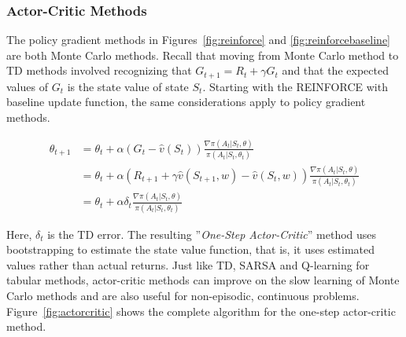 \subsubsection*{Actor-Critic Methods}

The policy gradient methods in Figures~\ref{fig:reinforce} and \ref{fig:reinforcebaseline} are both Monte Carlo methods. Recall that moving from Monte Carlo method to TD methods involved recognizing that $G_{t+1} = R_t + \gamma G_t$ and that the expected values of $G_t$ is the state value of state $S_t$. Starting with the REINFORCE with baseline update function, the same considerations apply to policy gradient methods.

\begin{align*}
\theta_{t+1} &= \theta_t + \alpha (G_{t} - \hat{v}(S_t)) \frac{\nabla \pi(A_t | S_t, \theta)}{\pi(A_t | S_t, \theta_t)} \\
&= \theta_t + \alpha (R_{t+1} + \gamma \hat{v}(S_{t+1}, w) - \hat{v}(S_t, w)) \frac{\nabla \pi(A_t | S_t, \theta)}{\pi(A_t | S_t, \theta_t)} \\
&= \theta_t + \alpha \delta_t \frac{\nabla \pi(A_t | S_t, \theta)}{\pi(A_t | S_t, \theta_t)}
\end{align*}

Here, $\delta_t$ is the TD error. The resulting ''\emph{One-Step Actor-Critic}'' method uses bootstrapping to estimate the state value function, that is, it uses estimated values rather than actual returns. Just like TD, SARSA and Q-learning for tabular methods, actor-critic methods can improve on the slow learning of Monte Carlo methods and are also useful for non-episodic, continuous problems. Figure~\ref{fig:actorcritic} shows the complete algorithm for the one-step actor-critic method.

